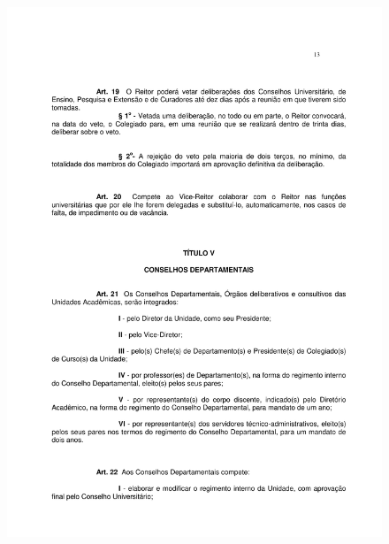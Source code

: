 \begin{figure}[p]
	\centering 
	\includegraphics[scale=0.7]{capitulos/resolucoes/cuni414/cuni414-13.pdf}
\end{figure}

